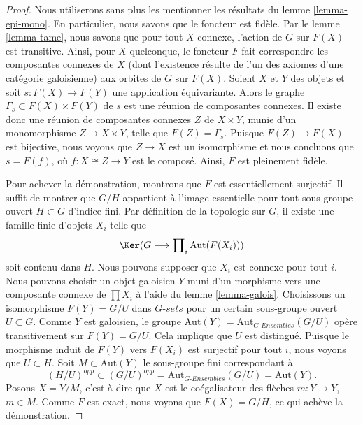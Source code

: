 \begin{proof}
Nous utiliserons sans plus les mentionner les résultats du lemme \ref{lemma-epi-mono}.
En particulier, nous savons que le foncteur est fidèle.
Par le lemme \ref{lemma-tame}, nous savons que pour tout $X$ connexe,
l'action de $G$ sur $F(X)$ est transitive. Ainsi, pour $X$ quelconque, le foncteur
$F$ fait correspondre les composantes connexes de $X$ (dont l'existence résulte
de l'un des axiomes d'une catégorie galoisienne) aux orbites de $G$ sur $F(X)$.
Soient $X$ et $Y$ des objets et soit
$s : F(X) \to F(Y)$ une application équivariante. Alors le graphe
$\Gamma_s \subset F(X) \times F(Y)$ de $s$
est une réunion de composantes connexes. Il existe donc une
réunion de composantes connexes $Z$ de $X \times Y$,
munie d'un monomorphisme $Z \to X \times Y$,
telle que $F(Z) = \Gamma_s$. Puisque $F(Z) \to F(X)$ est bijective,
nous voyons que $Z \to X$ est un isomorphisme et nous concluons
que $s = F(f)$, où $f : X \cong Z \to Y$ est le composé.
Ainsi, $F$ est pleinement fidèle.

\medskip\noindent
Pour achever la démonstration, montrons que $F$ est essentiellement surjectif.
Il suffit de montrer que $G/H$ appartient à l'image essentielle pour
tout sous-groupe ouvert $H \subset G$ d'indice fini.
Par définition de la topologie sur $G$, il existe une famille finie
d'objets $X_i$ telle que
$$
\Ker(G \longrightarrow \prod\nolimits_i \text{Aut}(F(X_i)))
$$
soit contenu dans $H$. Nous pouvons supposer que $X_i$ est connexe
pour tout $i$. Nous pouvons choisir un objet galoisien $Y$ muni d'un morphisme
vers une composante connexe de $\prod X_i$ à l'aide du
lemme \ref{lemma-galois}. Choisissons un isomorphisme $F(Y) = G/U$
dans $G\textit{-sets}$ pour un certain sous-groupe ouvert $U \subset G$.
Comme $Y$ est galoisien, le groupe
$\text{Aut}(Y) = \text{Aut}_{G\textit{-Ensembles}}(G/U)$ opère transitivement
sur $F(Y) = G/U$. Cela implique que $U$ est distingué. Puisque
le morphisme induit de $F(Y)$ vers $F(X_i)$ est surjectif pour tout $i$, nous voyons que
$U \subset H$. Soit $M \subset \text{Aut}(Y)$ le sous-groupe fini
correspondant à
$$
(H/U)^{opp} \subset (G/U)^{opp} = \text{Aut}_{G\textit{-Ensembles}}(G/U)
= \text{Aut}(Y).
$$
Posons $X = Y/M$, c'est-à-dire que $X$ est le coégalisateur
des flèches $m : Y \to Y$, $m \in M$.
Comme $F$ est exact, nous voyons que $F(X) = G/H$, ce qui achève
la démonstration.
\end{proof}

